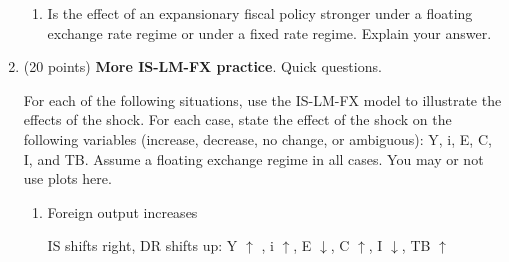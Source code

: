 \documentclass[11pt,dvipsnames]{article} %
\newif \ifAnswers
\begin{document}
\begin{enumerate}
\begin{enumerate}
				\item Is the effect of  an expansionary fiscal policy stronger under a floating exchange rate regime or under a fixed rate regime. Explain your answer.
				
				\ifAnswers
				
				{\color{Blue}
					\begin{framed}
						It is stronger under a fixed regime. Fiscal policy crowds out investment and the trade balance because it leads to an increase in the interest rates. This limits the expansionary effect of fiscal policy on the output.\\
						
						Under a fixed exchange rate regime, these effects are nullified because after the fiscal policy (e.g., increase in G) the central bank has to increase the money supply to bring the interest rate down to its initial level.
					\end{framed}%
				}
				
				\fi
				
			\end{enumerate}
		
			\item  (20 points) \textbf{More IS-LM-FX practice}. Quick questions.
			
			For each of the following situations, use the IS-LM-FX model to illustrate the effects of the shock. For each case, state the effect of the shock on the following variables (increase, decrease, no change, or ambiguous): Y, i, E, C, I, and TB.  Assume a floating exchange regime in all cases. You may or not use plots here.
			
			\begin{enumerate}
				\item Foreign output increases
				
				\ifAnswers
				
				{\color{Blue}
					\begin{framed}
						IS shifts right, DR shifts up: Y $\uparrow$ , i $\uparrow$, E $\downarrow$, C $\uparrow$, I $\downarrow$, TB $\uparrow$\\
						
							
							
							
							\begin{tikzpicture}[x=0.75pt,y=0.75pt,yscale=-1,xscale=1]
								

\end{tikzpicture}
\end{framed}}
\end{enumerate}
\end{enumerate}
\end{document}
